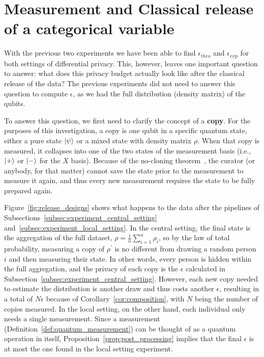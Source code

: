 \documentclass{ieeeaccess}
\begin{document}
\section{Measurement and Classical release of a categorical variable}
\label{sec:measurement_release}

With the previous two experiments we have been able to find $\epsilon_{theo}$ and $\epsilon_{exp}$ for both settings of differential privacy. This, however, leaves one important question to answer: what does this privacy budget actually look like after the classical release of the data? The previous experiments did not need to answer this question to compute $\epsilon$, as we had the full distribution (density matrix) of the qubits.

To answer this question, we first need to clarify the concept of a \textbf{copy}. For the purposes of this investigation, a copy is one qubit in a specific quantum state, either a pure state $\ket{\psi}$ or a mixed state with density matrix $\rho$. When that copy is measured, it collapses into one of the two states of the measurement basis (i.e., $\ket{+}$ or $\ket{-}$ for the $X$ basis). Because of the no-cloning theorem~\cite{watrous_limitations}, the curator (or anybody, for that matter) cannot save the state prior to the measurement to measure it again, and thus every new measurement requires the state to be fully prepared again.

Figure~\ref{fig:release_designs} shows what happens to the data after the pipelines of Subsections~\ref{subsec:experiment_central_setting} and~\ref{subsec:experiment_local_setting}. In the central setting, the final state is the aggregation of the full dataset, $\rho = \frac{1}{n}\sum_{i=1}^{n}\rho_i$, so by the law of total probability, measuring a copy of $\rho^{\prime}$ is no different from drawing a random person $i$ and then measuring their state. In other words, every person is hidden within the full aggregation, and the privacy of each copy is the $\epsilon$ calculated in Subsection~\ref{subsec:experiment_central_setting}. However, each new copy needed to estimate the distribution is another draw and thus costs another $\epsilon$, resulting in a total of $N\epsilon$ because of Corollary~\ref{cor:composition}, with $N$ being the number of copies measured. In the local setting, on the other hand, each individual only needs a single measurement. Since a measurement (Definition~\ref{def:quantum_measurement}) can be thought of as a quantum operation in itself, Proposition~\ref{prop:post_processing} implies that the final $\epsilon$ is at most the one found in the local setting experiment. 
\end{document}
